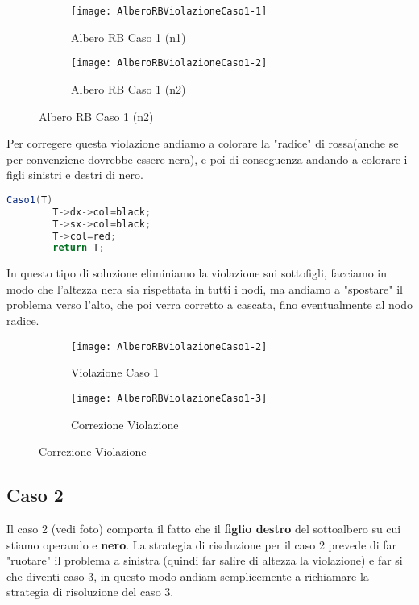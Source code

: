 \begin{figure}[H]
    \centering
    \begin{subfigure}[b]{0.35\textwidth}
        \texttt{[image: AlberoRBViolazioneCaso1-1]} 
        \caption{Albero RB Caso 1 (n1)}
    \end{subfigure}
    \hfill
    \begin{subfigure}[b]{0.35\textwidth}
        \texttt{[image: AlberoRBViolazioneCaso1-2]} 
        \caption{Albero RB Caso 1 (n2)}
    \end{subfigure}
\end{figure}

Per corregere questa violazione andiamo a colorare la "radice" di rossa(anche se per convenziene dovrebbe essere nera), e poi di conseguenza andando a colorare i figli sinistri e destri di nero.
\begin{lstlisting}[language=Java]
	Caso1(T)
		T->dx->col=black;
		T->sx->col=black;
		T->col=red;
		return T;
\end{lstlisting}

In questo tipo di soluzione eliminiamo la violazione sui sottofigli, facciamo in modo che l'altezza nera sia rispettata in tutti i nodi, ma andiamo a "spostare" il problema verso l'alto, che poi verra corretto a cascata, fino eventualmente al nodo radice.

\begin{figure}[H]
    \centering
    \begin{subfigure}[b]{0.35\textwidth}
        \texttt{[image: AlberoRBViolazioneCaso1-2]} 
        \caption{Violazione Caso 1}
    \end{subfigure}
    \hfill
    \begin{subfigure}[b]{0.35\textwidth}
        \texttt{[image: AlberoRBViolazioneCaso1-3]} 
        \caption{Correzione Violazione}
    \end{subfigure}
\end{figure}


\subsection{Caso 2}

Il caso 2 (vedi foto) comporta il fatto che il \textbf{figlio destro} del sottoalbero su cui stiamo operando e \textbf{nero}. La strategia di risoluzione per il caso 2 prevede di far "ruotare" il problema a sinistra (quindi far salire di altezza la violazione) e far si che diventi caso 3, in questo modo andiam semplicemente a richiamare la strategia di risoluzione del caso 3.

